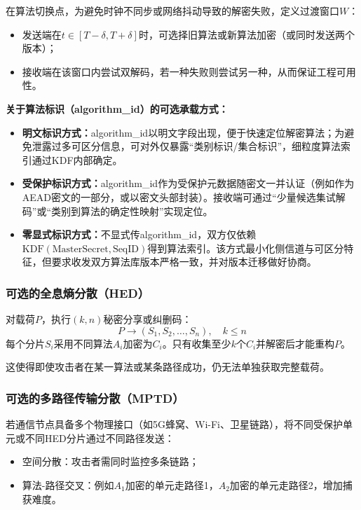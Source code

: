 \documentclass[12pt,a4paper]{article}
\begin{document}
在算法切换点，为避免时钟不同步或网络抖动导致的解密失败，定义过渡窗口$W$：

\begin{itemize}
    \item 发送端在$t \in [T-\delta, T+\delta]$时，可选择旧算法或新算法加密（或同时发送两个版本）；
    \item 接收端在该窗口内尝试双解码，若一种失败则尝试另一种，从而保证工程可用性。
\end{itemize}

	\textbf{关于算法标识（algorithm\_id）的可选承载方式：}
\begin{itemize}
    \item \textbf{明文标识方式：}algorithm\_id以明文字段出现，便于快速定位解密算法；为避免泄露过多可区分信息，可对外仅暴露“类别标识/集合标识”，细粒度算法索引通过KDF内部确定。
    \item \textbf{受保护标识方式：}algorithm\_id作为受保护元数据随密文一并认证（例如作为AEAD密文的一部分，或以密文头部封装）。接收端可通过“少量候选集试解码”或“类别到算法的确定性映射”实现定位。
    \item \textbf{零显式标识方式：}不显式传algorithm\_id，双方仅依赖$\text{KDF}(\text{MasterSecret},\text{SeqID})$得到算法索引。该方式最小化侧信道与可区分特征，但要求收发双方算法库版本严格一致，并对版本迁移做好协商。
\end{itemize}

\subsubsection{可选的全息熵分散（HED）}

对载荷$P$，执行$(k,n)$秘密分享或纠删码：
\[
P \to (S_1, S_2, \ldots, S_n), \quad k \leq n
\]
每个分片$S_i$采用不同算法$A_i$加密为$C_i$。只有收集至少$k$个$C_i$并解密后才能重构$P$。

这使得即使攻击者在某一算法或某条路径成功，仍无法单独获取完整载荷。

\subsubsection{可选的多路径传输分散（MPTD）}

若通信节点具备多个物理接口（如5G蜂窝、Wi-Fi、卫星链路），将不同受保护单元或不同HED分片通过不同路径发送：

\begin{itemize}
    \item 空间分散：攻击者需同时监控多条链路；
    \item 算法-路径交叉：例如$A_1$加密的单元走路径1，$A_2$加密的单元走路径2，增加捕获难度。
\end{itemize}
\end{document}
